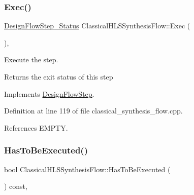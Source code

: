 \mbox{\label{classClassicalHLSSynthesisFlow_a719619247564584bd858b259239cffcc}} 
\subsubsection{\texorpdfstring{Exec()}{Exec()}}
{\footnotesize\ttfamily \hyperlink{design__flow__step_8hpp_afb1f0d73069c26076b8d31dbc8ebecdf}{Design\+Flow\+Step\+\_\+\+Status} Classical\+H\+L\+S\+Synthesis\+Flow\+::\+Exec (\begin{DoxyParamCaption}{ }\end{DoxyParamCaption})\hspace{0.3cm}{\ttfamily [override]}, {\ttfamily [virtual]}}



Execute the step. 

\begin{DoxyReturn}{Returns}
the exit status of this step 
\end{DoxyReturn}


Implements \hyperlink{classDesignFlowStep_a77d7e38493016766098711ea24f60b89}{Design\+Flow\+Step}.



Definition at line 119 of file classical\+\_\+synthesis\+\_\+flow.\+cpp.



References E\+M\+P\+TY.

\mbox{\label{classClassicalHLSSynthesisFlow_aa0913cd5f8a697a6103d3047dc156886}} 
\subsubsection{\texorpdfstring{Has\+To\+Be\+Executed()}{HasToBeExecuted()}}
{\footnotesize\ttfamily bool Classical\+H\+L\+S\+Synthesis\+Flow\+::\+Has\+To\+Be\+Executed (\begin{DoxyParamCaption}{ }\end{DoxyParamCaption}) const\hspace{0.3cm}{\ttfamily [override]}, {\ttfamily [virtual]}}



